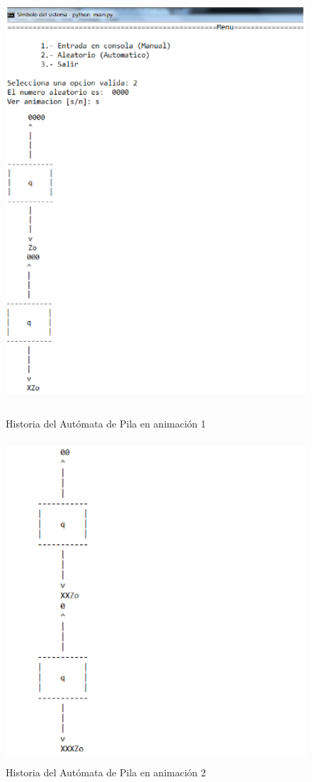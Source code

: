 	\begin{figure}[H]
		\begin{center}
			\includegraphics[width=14cm, height=16cm]{img/pila-automatico-consola1.png}
			\caption{Historia del Autómata de Pila en animación 1}
			\label{fig:pila2a}
		\end{center}
	\end{figure}
	\begin{figure}[H]
		\begin{center}
			\includegraphics[width=14cm, height=12cm]{img/pila-automatico-consola2.png}
			\caption{Historia del Autómata de Pila en animación 2}
			\label{fig:pila2b}
		\end{center}
	\end{figure}
